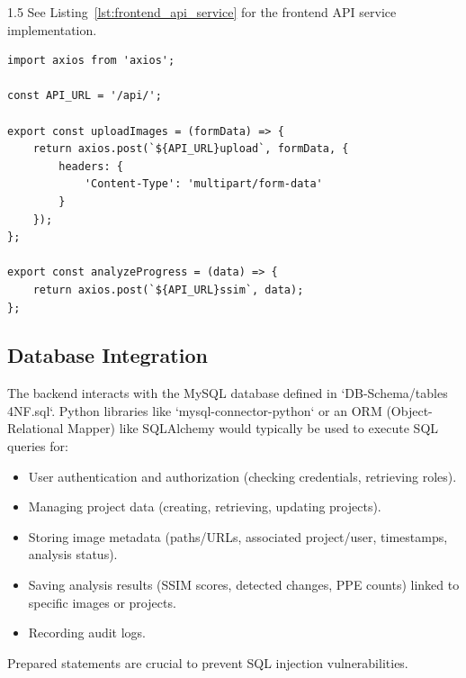 \documentclass[12pt,a4paper]{report}
\begin{document}
\begin{spacing}{1.5}
    See Listing~\ref{lst:frontend_api_service} for the frontend API service implementation.

    \begin{listing}[H]
        \caption{Frontend API Service for Image Upload and Progress Analysis}
        \label{lst:frontend_api_service}
        \begin{verbatim}
import axios from 'axios';

const API_URL = '/api/';

export const uploadImages = (formData) => {
    return axios.post(`${API_URL}upload`, formData, {
        headers: {
            'Content-Type': 'multipart/form-data'
        }
    });
};

export const analyzeProgress = (data) => {
    return axios.post(`${API_URL}ssim`, data);
};
    \end{verbatim}
    \end{listing}

    \subsection{Database Integration}
    The backend interacts with the MySQL database defined in `DB-Schema/tables 4NF.sql`. Python libraries like `mysql-connector-python` or an ORM (Object-Relational Mapper) like SQLAlchemy would typically be used to execute SQL queries for:
    \begin{itemize}
        \item User authentication and authorization (checking credentials, retrieving roles).
        \item Managing project data (creating, retrieving, updating projects).
        \item Storing image metadata (paths/URLs, associated project/user, timestamps, analysis status).
        \item Saving analysis results (SSIM scores, detected changes, PPE counts) linked to specific images or projects.
        \item Recording audit logs.
    \end{itemize}
    Prepared statements are crucial to prevent SQL injection vulnerabilities.


\end{spacing}
\end{document}
